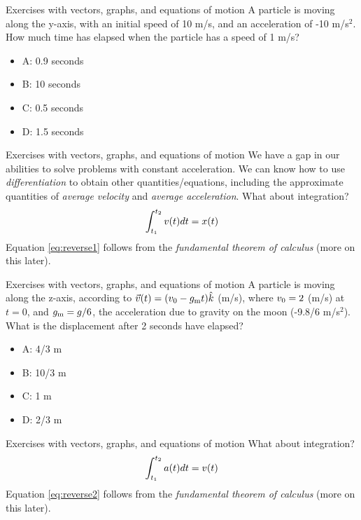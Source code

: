 \documentclass{beamer}
\begin{document}
\begin{frame}{Exercises with vectors, graphs, and equations of motion}
A particle is moving along the y-axis, with an initial speed of 10 m/s, and an acceleration of -10 m/s$^2$.  How much time has elapsed when the particle has a speed of 1 m/s?\\
\begin{itemize}
\item A: 0.9 seconds
\item B: 10 seconds
\item C: 0.5 seconds
\item D: 1.5 seconds
\end{itemize}
\end{frame}

\begin{frame}{Exercises with vectors, graphs, and equations of motion}
We have a gap in our abilities to solve problems with constant acceleration.  We can know how to use \textit{differentiation} to obtain other quantities/equations, including the approximate quantities of \textit{average velocity} and \textit{average acceleration}.  What about integration? \\
\begin{equation}
\int_{t_{\rm 1}}^{t_{\rm 2}} v(t) dt = x(t)
\label{eq:reverse1}
\end{equation}
Equation \ref{eq:reverse1} follows from the \textit{fundamental theorem of calculus} (more on this later).
\end{frame}

\begin{frame}{Exercises with vectors, graphs, and equations of motion}
A particle is moving along the z-axis, according to $\vec{v}(t) = (v_{\rm 0}-g_{\rm m}t) \hat{k}$ (m/s), where $v_{\rm 0} = 2$ (m/s) at $t=0$, and $g_{\rm m} = g/6$, the acceleration due to gravity on the moon (-9.8/6 m/s$^2$). What is the displacement after 2 seconds have elapsed?\\
\begin{itemize}
\item A: 4/3 m
\item B: 10/3 m
\item C: 1 m
\item D: 2/3 m
\end{itemize}
\end{frame}

\begin{frame}{Exercises with vectors, graphs, and equations of motion}
What about integration? \\
\begin{equation}
\int_{t_{\rm 1}}^{t_{\rm 2}} a(t) dt = v(t)
\label{eq:reverse2}
\end{equation}
Equation \ref{eq:reverse2} follows from the \textit{fundamental theorem of calculus} (more on this later).
\end{frame}
\end{document}

